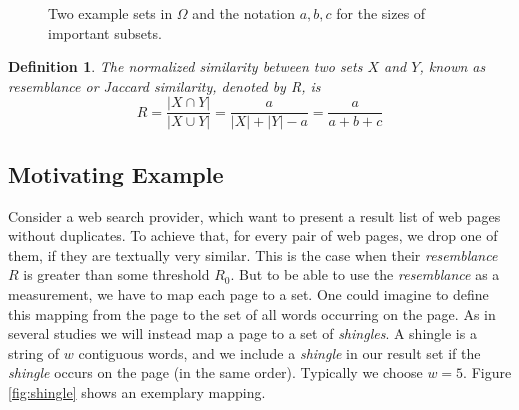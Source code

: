 \documentclass[a4paper]{article}
\newtheorem{mydef}{Definition}
\begin{document}
\begin{figure}[H]
\centering
{}
\caption{Two example sets in $\Omega$ and the notation $a,b,c$ for the sizes of important subsets.}
\label{fig:sets}
\end{figure}

\begin{framed}
\begin{mydef}\label{def:jaccard}
The normalized similarity between two sets $X$ and $Y$, known as \emph{resemblance} or \emph{Jaccard similarity}, denoted by R, is
\begin{equation}
R=\frac{\left| X \cap Y \right|}{\left| X \cup Y \right|} = \frac{a}{\left| X \right| + \left| Y \right| -a}=\frac{a}{a+b+c}
\end{equation}
\end{mydef}
\end{framed}

\subsection{Motivating Example}
Consider a web search provider, which want to present a result list of web pages without duplicates. To achieve that, for every pair of web pages, we drop one of them, if they are textually very similar. This is the case when their \emph{resemblance} $R$ is greater than some threshold $R_0$. But to be able to use the \emph{resemblance} as a measurement, we have to map each page to a set. One could imagine to define this mapping from the page to the set of all words occurring on the page. As in several studies \citep{Broder:1998,BroderGMZ97} we will instead map a page to a set of \emph{shingles}. A shingle is a string of $w$ contiguous words, and we include a \emph{shingle} in our result set if the \emph{shingle} occurs on the page (in the same order). Typically we choose $w = 5$. Figure \vref{fig:shingle} shows an exemplary mapping.
\end{document}
